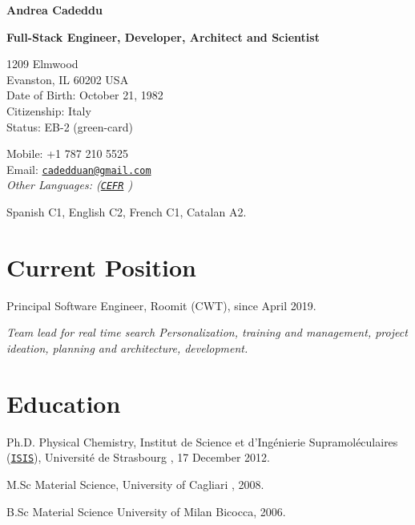 \documentclass[11pt,letterpaper]{article}
\def\name{Andrea Cadeddu }
\renewenvironment{itemize}{
  \begin{list}{}{
    \setlength{\leftmargin}{1.5em}
  }
}{
  \end{list}
}
\begin{document}
{\huge \bf \name}

\vspace{0.25in}
{\Large \bf \sffamily Full-Stack Engineer, Developer, Architect and Scientist}

\vspace{0.25in}

\begin{minipage}[t]{0.5\textwidth}
  1209 Elmwood\\
Evanston, IL 60202
  USA \\
  Date of Birth: October 21, 1982 \\
  Citizenship: Italy\\
  Status: EB-2 (green-card)
\end{minipage}
\begin{minipage}[t]{0.5\textwidth}
  Mobile: +1 787 210 5525\\
  Email: \href{mailto:cadedduan@gmail.com}{\tt cadedduan@gmail.com} \\
  \textit{Other Languages: (\href{http://en.wikipedia.org/wiki/Common_European_Framework_of_Reference_for_Languages}{\tt CEFR} )} 

Spanish C1,
English C2, 
French C1,
Catalan A2.

\end{minipage}

\section*{Current Position}

\begin{itemize}
\item Principal Software Engineer, Roomit (CWT), since April 2019. 

\textit{Team lead for real time search Personalization, training and management, project ideation, planning and architecture, development.}

\end{itemize}
\section*{Education}

\begin{itemize}

  \item  Ph.D. Physical Chemistry, Institut de Science et d'Ing\'enierie Supramol\'eculaires (\href{http://www-isis.u-strasbg.fr/}{\texttt{ISIS}}), Universit\'e de Strasbourg , 17 December 2012.

  \item  M.Sc Material Science, University of Cagliari , 2008.

  \item B.Sc Material Science University of Milan Bicocca, 2006.
  
\end{itemize}
\end{document}
